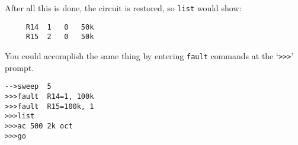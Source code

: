 After all this is done, the circuit is restored, so {\tt list} would show:
\begin{verbatim}
     R14  1   0   50k
     R15  2   0   50k
\end{verbatim}

You could accomplish the same thing by entering {\tt fault} commands at the
`{\tt >>>}' prompt.

\begin{verbatim}
-->sweep  5
>>>fault  R14=1, 100k
>>>fault  R15=100k, 1
>>>list
>>>ac 500 2k oct
>>>go
\end{verbatim}
